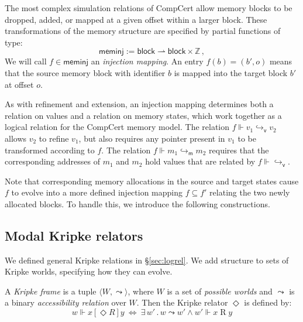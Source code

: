 \documentclass[sigplan,10pt,review,anonymous]{acmart}
\newcommand{\kw}[1]{\ensuremath{ \mathsf{#1} }}
\newcommand{\ifr}[1]{\mathrel{[{#1}]}}
\begin{document}
The most complex simulation relations of CompCert
allow memory blocks to be dropped, added, or
mapped at a given offset within a larger block.
These transformations of the memory structure
are specified by partial functions of type:
\[
  \kw{meminj} := \kw{block} \rightharpoonup \kw{block} \times \mathbb{Z} \,,
\]
We will call $f \in \kw{meminj}$
an \emph{injection mapping}.
An entry $f(b) = (b', o)$
means that the source memory block with identifier $b$
is mapped into the target block $b'$
at offset $o$.

As with refinement and extension,
an injection mapping determines both
a relation on values and
a relation on memory states,
which work together
as a logical relation for the CompCert memory model.
The relation $f \Vdash v_1 \hookrightarrow_\kw{v} v_2$
allows $v_2$ to refine $v_1$,
but also requires any pointer present in $v_1$ 
to be transformed according to $f$.
The relation $f \Vdash m_1 \hookrightarrow_\kw{m} m_2$
requires that the corresponding addresses of $m_1$ and $m_2$
hold values that are related by $f \Vdash {\hookrightarrow_\kw{v}}$.

Note that corresponding memory allocations
in the source and target states cause $f$ to
evolve into a more defined injection mapping $f \subseteq f'$
relating the two newly allocated blocks.
To handle this,
we introduce the following constructions.


\subsection{Modal Kripke relators} %

We defined general Kripke relations in \S\ref{sec:logrel}.
We add structure to sets of Kripke worlds,
specifying how they can evolve.

\begin{definition} %
A \emph{Kripke frame} is a tuple
$\langle W, {\leadsto} \rangle$, where
$W$ is a set of \emph{possible worlds} and
$\leadsto$ is a
binary \emph{accessibility relation} over $W$.
Then the Kripke relator $\Diamond$ is defined by:
\[
  w \Vdash x \ifr{\Diamond R} y \: \Leftrightarrow \:
    \exists \, w' \,.\, w \leadsto w' \wedge
      w' \Vdash x \mathrel{R} y
\]
\end{definition}
\end{document}

